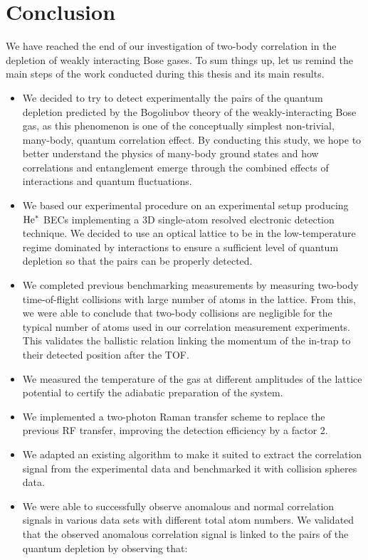 \section{Conclusion}

We have reached the end of our investigation of two-body correlation in the depletion of weakly interacting Bose gases. To sum things up, let us remind the main steps of the work conducted during this thesis and its main results.

\begin{itemize}
    \item We decided to try to detect experimentally the \kmk pairs of the quantum depletion predicted by the Bogoliubov theory of the weakly-interacting Bose gas, as this phenomenon is one of the conceptually simplest non-trivial, many-body, quantum correlation effect. By conducting this study, we hope to better understand the physics of many-body ground states and how correlations and entanglement emerge through the combined effects of interactions and quantum fluctuations.
    \item We based our experimental procedure on an experimental setup producing $\mathrm{He}^*$ BECs  implementing a 3D single-atom resolved electronic detection technique. We decided to use an optical lattice to be in the low-temperature regime dominated by interactions to ensure a sufficient level of quantum depletion so that the \kmk pairs can be properly detected.
    \item We completed previous benchmarking measurements \cite{cayla2018single} by measuring two-body time-of-flight collisions with large number of atoms in the lattice. From this, we were able to conclude that two-body collisions are negligible for the typical number of atoms used in our correlation measurement experiments. This validates the ballistic relation linking the momentum of the in-trap to their detected position after the TOF.
    \item We measured the temperature of the gas at different amplitudes of the lattice potential to certify the adiabatic preparation of the system.
    \item We implemented a two-photon Raman transfer scheme to replace the previous RF transfer, improving the detection efficiency by a factor 2.
    \item We adapted an existing algorithm to make it suited to extract the \kmk correlation signal from the experimental data and benchmarked it with collision spheres data.
    \item We were able to successfully observe anomalous and normal correlation signals in various data sets with different total atom numbers. We validated that the observed anomalous correlation signal is linked to the \kmk pairs of the quantum depletion by observing that:

\end{itemize}
